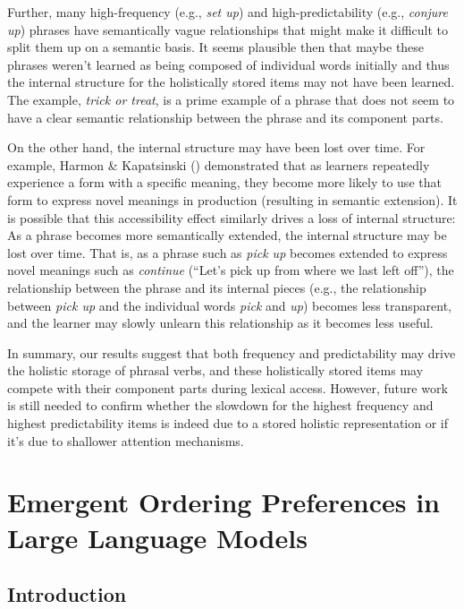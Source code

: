 \documentclass[
  12pt,
  letterpaper,
]{scrreport}
\begin{document}
Further, many high-frequency (e.g., \emph{set up}) and
high-predictability (e.g., \emph{conjure up}) phrases have semantically
vague relationships that might make it difficult to split them up on a
semantic basis. It seems plausible then that maybe these phrases weren't
learned as being composed of individual words initially and thus the
internal structure for the holistically stored items may not have been
learned. The example, \emph{trick or treat}, is a prime example of a
phrase that does not seem to have a clear semantic relationship between
the phrase and its component parts.

On the other hand, the internal structure may have been lost over time.
For example, Harmon \& Kapatsinski
() demonstrated that as
learners repeatedly experience a form with a specific meaning, they
become more likely to use that form to express novel meanings in
production (resulting in semantic extension). It is possible that this
accessibility effect similarly drives a loss of internal structure: As a
phrase becomes more semantically extended, the internal structure may be
lost over time. That is, as a phrase such as \emph{pick up} becomes
extended to express novel meanings such as \emph{continue} (``Let's pick
up from where we last left off''), the relationship between the phrase
and its internal pieces (e.g., the relationship between \emph{pick up}
and the individual words \emph{pick} and \emph{up}) becomes less
transparent, and the learner may slowly unlearn this relationship as it
becomes less useful.

In summary, our results suggest that both frequency and predictability
may drive the holistic storage of phrasal verbs, and these holistically
stored items may compete with their component parts during lexical
access. However, future work is still needed to confirm whether the
slowdown for the highest frequency and highest predictability items is
indeed due to a stored holistic representation or if it's due to
shallower attention mechanisms.


\chapter{Emergent Ordering Preferences in Large Language
Models}\label{emergent-ordering-preferences-in-large-language-models}

\section{Introduction}\label{introduction-3}
\end{document}
